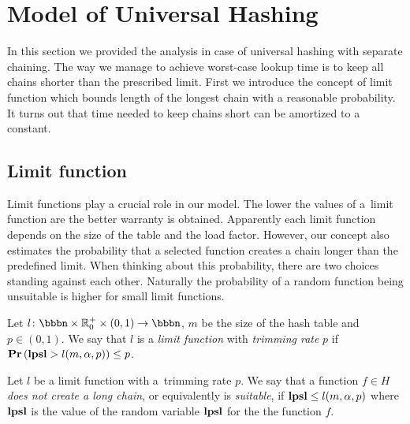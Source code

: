 \section{Model of Universal Hashing}
\label{section-model}
In this section we provided the analysis in case of universal hashing with separate chaining. The way we manage to achieve worst-case lookup time is to keep all chains shorter than the prescribed limit. First we introduce the concept of limit function which bounds length of the longest chain with a reasonable probability. It turns out that time needed to keep chains short can be amortized to a constant.

\subsection{Limit function}
Limit functions play a crucial role in our model. The lower the values of a~limit function are the better warranty is obtained. Apparently each limit function depends on the size of the table and the load factor. However, our concept also estimates the probability that a selected function creates a chain longer than the predefined limit. When thinking about this probability, there are two choices standing against each other. Naturally the probability of a random function being unsuitable is higher for small limit functions.

\begin{definition}
\label{definition-limit-function}
Let $l\colon \bbbn \times \mathbb{R}_0^+ \times (0, 1) \rightarrow \bbbn$, $m$ be the size of the hash table and $p \in (0, 1)$.  We say that $l$ is a \emph{limit function} with \emph{trimming rate} $p$ if $\mathbf{Pr}\left(\mathbf{lpsl} > l(m, \alpha, p)\right) \leq p$.

Let $l$ be a limit function with a~trimming rate $p$. We say that a function $f \in H$ \emph{does not create a long chain}, or equivalently is \emph{suitable}, if $\mathbf{lpsl} \le l(m, \alpha, p)$ where $\mathbf{lpsl}$ is the value of the random variable $\mathbf{lpsl}$ for the the function $f$.
\end{definition}

